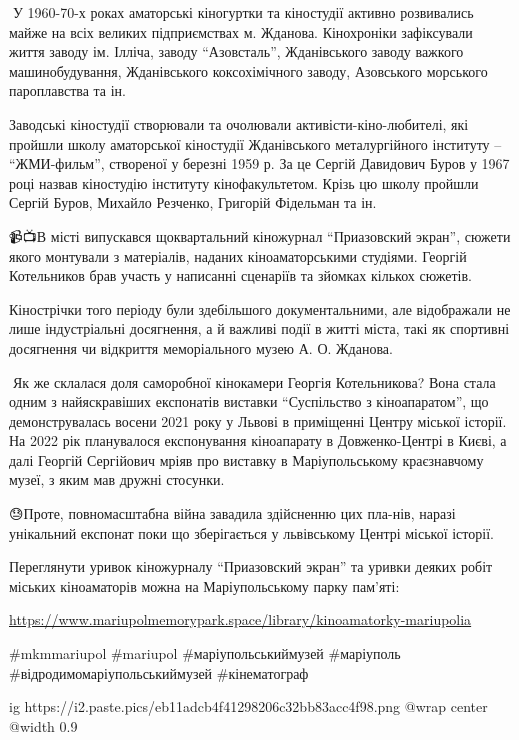 📍У 1960-70-х роках аматорські кіногуртки та кіностудії активно розвивались
майже на всіх великих  підприємствах м. Жданова. Кінохроніки зафіксували життя
заводу ім. Ілліча, заводу \enquote{Азовсталь}, Жданівського заводу важкого
машинобудування, Жданівського коксохімічного заводу, Азовського морського
пароплавства та ін.

Заводські кіностудії створювали та очолювали активісти-кіно\hyp{}любителі, які
пройшли школу аматорської кіностудії Жданівського металургійного інституту –
\enquote{ЖМИ-фильм}, створеної у березні 1959 р. За це Сергій Давидович Буров у 1967
році назвав кіностудію інституту кінофакультетом. Крізь цю школу пройшли Сергій
Буров, Михайло Резченко, Григорій Фідельман та ін.

📹📺В місті випускався щоквартальний кіножурнал \enquote{Приазовский экран}, сюжети
якого монтували з матеріалів, наданих кіноаматорськими студіями. Георгій
Котельников брав участь у написанні сценаріїв та зйомках кількох сюжетів.

Кінострічки того періоду були здебільшого документальними, але відображали не
лише індустріальні досягнення, а й важливі події в житті міста, такі як
спортивні досягнення чи відкриття меморіального музею А. О. Жданова.

🙌Як же склалася доля саморобної кінокамери Георгія Котельникова? Вона стала
одним з найяскравіших експонатів виставки \enquote{Суспільство з кіноапаратом}, що
демонструвалась восени 2021 року у Львові в приміщенні Центру міської історії.
На 2022 рік планувалося експонування кіноапарату в Довженко-Центрі в Києві, а
далі Георгій Сергійович мріяв про виставку в Маріупольському краєзнавчому
музеї, з яким мав дружні стосунки. 

😓Проте, повномасштабна війна завадила здійсненню цих пла\hyp{}нів, наразі унікальний
експонат поки що зберігається у львівському Центрі міської історії.

Переглянути уривок кіножурналу \enquote{Приазовский экран} та уривки деяких
робіт міських кіноаматорів можна на Маріупольському парку пам'яті: 

\url{https://www.mariupolmemorypark.space/library/kinoamatorky-mariupolia}

\#mkmmariupol \#mariupol \#маріупольськиймузей \#маріуполь \#відродимомаріупольськиймузей \#кінематограф

\ifcmt
  ig https://i2.paste.pics/eb11adcb4f41298206c32bb83acc4f98.png
  @wrap center
  @width 0.9
\fi
